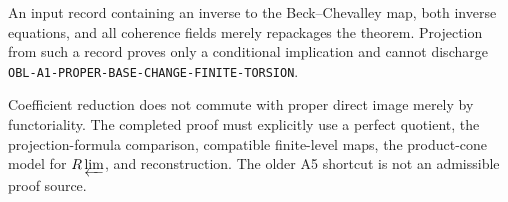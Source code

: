 \begin{warning}
An input record containing an inverse to the Beck--Chevalley map, both inverse
equations, and all coherence fields merely repackages the theorem.  Projection
from such a record proves only a conditional implication and cannot discharge
\nolinkurl{OBL-A1-PROPER-BASE-CHANGE-FINITE-TORSION}.
\end{warning}

\begin{warning}
Coefficient reduction does not commute with proper direct image merely by
functoriality.  The completed proof must explicitly use a perfect quotient,
the projection-formula comparison, compatible finite-level maps, the
product-cone model for $R\varprojlim$, and reconstruction.  The older A5
shortcut is not an admissible proof source.
\end{warning}

